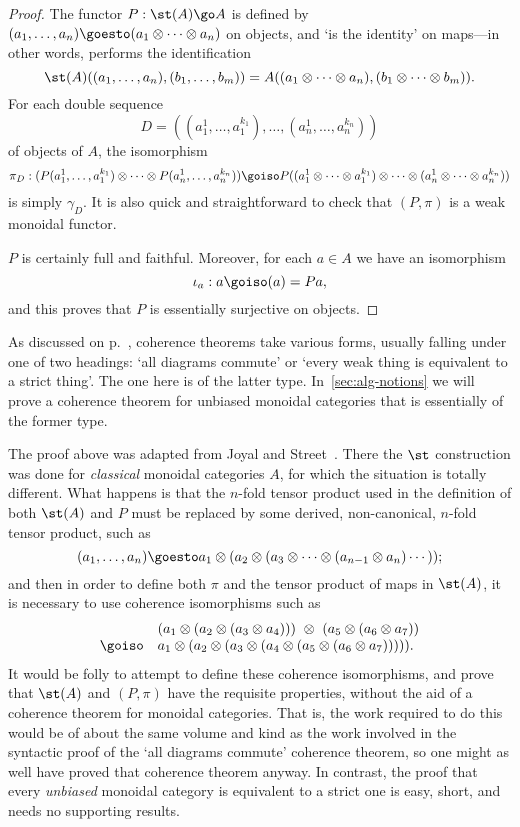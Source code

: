 \begin{proof}
The functor $P: \st(A) \go A$ is defined by
$
(a_1, \ldots, a_n) \goesto (a_1 \otimes\cdots\otimes a_n)
$
on objects, and `is the identity' on maps---in other words, performs the
identification
\[
\st(A)((a_1, \ldots, a_n), (b_1, \ldots, b_m))
=
A((a_1 \otimes\cdots\otimes a_n), (b_1 \otimes\cdots\otimes b_m)).
\]
For each double sequence 
\[
D = ((a_1^1, \ldots, a_1^{k_1}), \ldots, (a_n^1, \ldots, a_n^{k_n}))
\]
of objects of $A$, the isomorphism
\[
\pi_D: 
(P(a_1^1, \ldots, a_1^{k_1}) \otimes\cdots\otimes 
P(a_n^1, \ldots, a_n^{k_n}))
\goiso
P((a_1^1 \otimes\cdots\otimes a_1^{k_1}) \otimes\cdots\otimes (a_n^1
\otimes\cdots\otimes a_n^{k_n}))
\]
is simply $\gamma_D$.  It is also quick and straightforward to check that
$(P,\pi)$ is a weak monoidal functor.

$P$ is certainly full and faithful.  Moreover, for each $a\in A$ we have
an isomorphism
\[
\iota_a: a \goiso (a) = Pa,
\]
and this proves that $P$ is essentially surjective on objects.
\done
\end{proof}

As discussed on p.~\pageref{p:coherence-discussion}, coherence%
%
%
theorems
take various forms, usually falling under one of two headings: `all
diagrams commute' or `every weak thing is equivalent to a strict thing'.
The one here is of the latter type.  In~\ref{sec:alg-notions} we will prove
a coherence theorem for unbiased monoidal categories that is essentially of
the former type.

The proof above was adapted from Joyal%
%
%
and Street~\cite[p.~29]{JSBTC}.%
%
%
There the $\st$ construction was done for \emph{classical}%
%
%
monoidal
categories $A$, for which the situation is totally different.  What happens
is that the $n$-fold tensor product used in the definition of both $\st(A)$
and $P$ must be replaced by some derived, non-canonical, $n$-fold tensor
product, such as
\[
(a_1, \ldots, a_n) 
\goesto 
a_1 \otimes (a_2 \otimes (a_3 \otimes \cdots \otimes (a_{n-1} \otimes a_n)
\cdots ));
\]
and then in order to define both $\pi$ and the tensor product of maps in
$\st(A)$, it is necessary to use coherence isomorphisms such as
\[
\begin{array}{rl}
&
(a_1 \otimes (a_2 \otimes (a_3 \otimes a_4)))
\ \otimes\ 
(a_5 \otimes (a_6 \otimes a_7))
\\
\goiso &
a_1 \otimes (a_2 \otimes (a_3 \otimes (a_4 \otimes (a_5 \otimes 
(a_6 \otimes a_7))))) .
\end{array}
\]
It would be folly to attempt to define these coherence isomorphisms, and
prove that $\st(A)$ and $(P, \pi)$ have the requisite properties, without
the aid of a coherence theorem for monoidal categories.  That is, the work
required to do this would be of about the same volume and kind as the work
involved in the syntactic proof of the `all diagrams commute' coherence
theorem, so one might as well have proved that coherence theorem anyway.
In contrast, the proof that every \emph{unbiased} monoidal category is
equivalent to a strict one is easy, short, and needs no supporting results.

